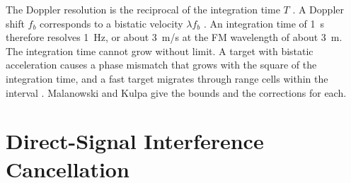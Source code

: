 The Doppler resolution is the reciprocal of the integration time $T$ \citep{colone2009}. A Doppler shift $f_b$ corresponds to a bistatic velocity $\lambda f_b$ \citep{colone2009}. An integration time of 1~s therefore resolves 1~Hz, or about 3~m/s at the FM wavelength of about 3~m. The integration time cannot grow without limit. A target with bistatic acceleration causes a phase mismatch that grows with the square of the integration time, and a fast target migrates through range cells within the interval \citep{malanowski2008}. Malanowski and Kulpa \citep{malanowski2008} give the bounds and the corrections for each.

\section{Direct-Signal Interference Cancellation}
\label{sec:th.dsi}
\todo{}

